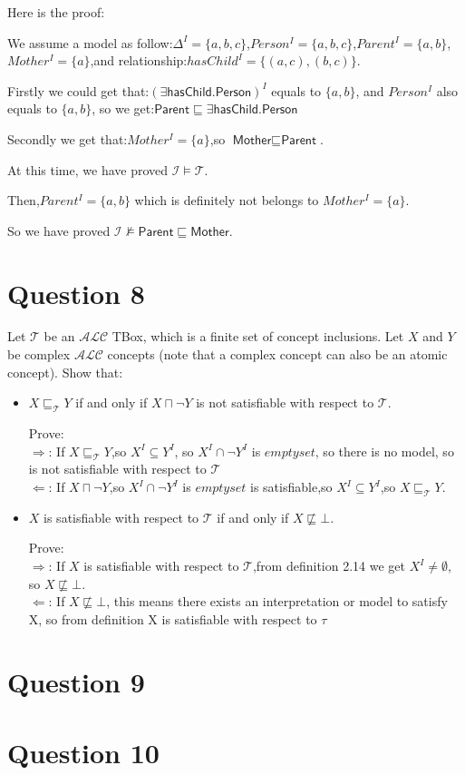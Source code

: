 \documentclass{article}
\begin{document}
	Here is the proof:
	
	We assume a model as follow:$\Delta^I = \{a,b,c\}$,$Person^I = \{a,b,c\}$,$Parent^I = \{a,b\}$,$Mother^I = \{a\}$,and relationship:$hasChild^I = \{(a,c),(b,c)\}$.
	
	Firstly we could get that:$(\exists\textsf{hasChild}.\textsf{Person})^I$ equals to $\{a,b\}$, and $Person^I$ also equals to $\{a,b\}$, so we get:$\textsf{Parent}\sqsubseteq\exists\textsf{hasChild}.\textsf{Person}$
	
	Secondly we get that:$Mother^I = \{a\}$,so $ \textsf{Mother}\sqsubseteq\textsf{Parent}$.
	
	At this time, we have proved $\mathcal{I}\models\mathcal{T}$.
	
	Then,$Parent^I = \{a,b\}$ which is definitely not belongs to $Mother^I = \{a\}$.

	So we have proved $\mathcal{I}\not\models\textsf{Parent}\sqsubseteq\textsf{Mother}$.


	\section{Question 8}

	Let $\mathcal{T}$ be an $\mathcal{ALC}$ TBox, which is a finite set of concept inclusions. Let $X$ and $Y$ be complex $\mathcal{ALC}$ concepts (note that a complex concept can also be an atomic concept). Show that:
	\begin{itemize}
    	\item $X\sqsubseteq_{\mathcal{T}}Y$ if and only if $X\sqcap\neg Y$ is not satisfiable with respect to $\mathcal{T}$.
    	
		Prove:\\
		$\Rightarrow$: 
		If  $X\sqsubseteq_{\mathcal{T}}Y$,so $X^I \subseteq Y^I$, so $X^I \cap \neg Y^I$ is $emptyset$, so there is no model, so is not satisfiable with respect to $\mathcal{T}$\\
		$\Leftarrow$:
		If $X\sqcap\neg Y$,so $X^I \cap \neg Y^I$ is $emptyset$ is satisfiable,so $X^I \subseteq Y^I$,so $X\sqsubseteq_{\mathcal{T}}Y$.

		\item $X$ is satisfiable with respect to $\mathcal{T}$ if and only if $X\not\sqsubseteq\bot$.

		Prove:\\
		$\Rightarrow$: 
		If $X$ is satisfiable with respect to $\mathcal{T}$,from definition 2.14 we get $X^I \neq \emptyset$, so $X\not\sqsubseteq\bot$.\\
		$\Leftarrow$:
		If $X\not\sqsubseteq\bot$, this means there exists an interpretation or model to satisfy X, so from definition X is satisfiable with respect to $\tau$
		 

	\end{itemize}

	

	\section{Question 9}

	\section{Question 10}
\end{document}
